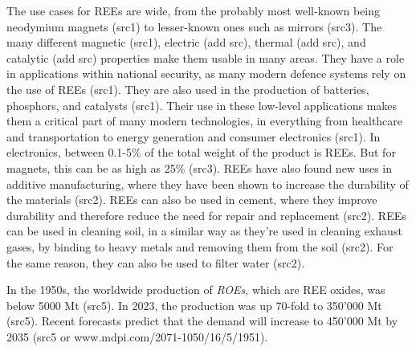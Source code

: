 The use cases for REEs are wide, from the probably most well-known being neodymium magnets (src1) to lesser-known ones such as mirrors (src3). The many different magnetic (src1), electric (add src), thermal (add src), and catalytic (add src) properties make them usable in many areas. They have a role in applications within national security, as many modern defence systems rely on the use of REEs (src1). They are also used in the production of batteries, phosphors, and catalysts (src1). Their use in these low-level applications makes them a critical part of many modern technologies, in everything from healthcare and transportation to energy generation and consumer electronics (src1). In electronics, between 0.1-5\% of the total weight of the product is REEs. But for magnets, this can be as high as 25\% (src3). REEs have also found new uses in additive manufacturing, where they have been shown to increase the durability of the materials (src2). REEs can also be used in cement, where they improve durability and therefore reduce the need for repair and replacement (src2). REEs can be used in cleaning soil, in a similar way as they're used in cleaning exhaust gases, by binding to heavy metals and removing them from the soil (src2). For the same reason, they can also be used to filter water (src2).

In the 1950s, the worldwide production of \textit{ROEs}, which are REE oxides, was below 5000 Mt (src5). In 2023, the production was up 70-fold to 350'000 Mt (src5). Recent forecasts predict that the demand will increase to 450'000 Mt by 2035 (src5 or www.mdpi.com/2071-1050/16/5/1951).